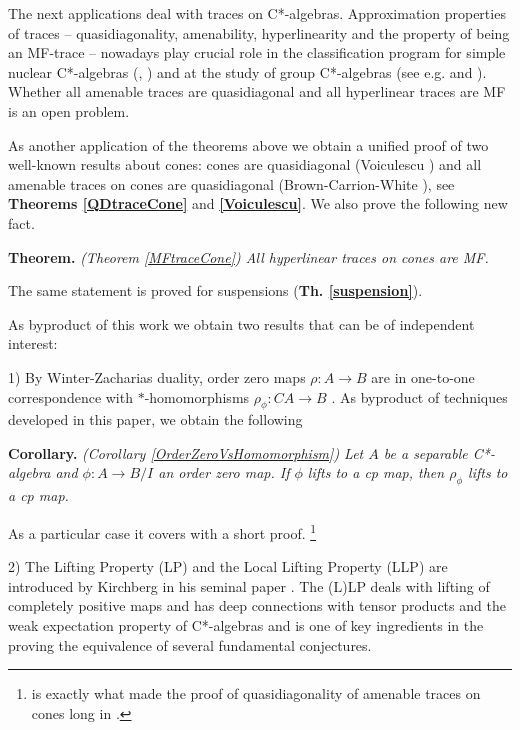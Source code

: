 \documentclass{article}%
\begin{document}
The next applications deal with traces on C*-algebras. Approximation properties of traces -- quasidiagonality, amenability, hyperlinearity and the property of being an MF-trace -- nowadays play crucial role in the classification program for simple nuclear C*-algebras (\cite{TWW},  \cite{Gabe}) and at the study of group C*-algebras (see e.g. \cite{RainoneSch} and \cite{SchafhauserAmalgamated}).
Whether all amenable traces are quasidiagonal and all hyperlinear traces are MF is an open problem.

As another application of the theorems above  we obtain a unified proof of two well-known results about cones: cones are quasidiagonal (Voiculescu \cite{Voiculescu}) and all amenable traces on cones are quasidiagonal (Brown-Carrion-White \cite{BCW}), see {\bf Theorems \ref{QDtraceCone} } and {\bf \ref{Voiculescu}}. We also prove the following new fact.

\medskip

{\bf Theorem.} {\it (Theorem \ref{MFtraceCone}) All hyperlinear traces on cones are MF. }


\medskip

\noindent The same statement is proved for suspensions ({\bf Th. \ref{suspension}}).

\medskip

As byproduct of this work we obtain two results that can be of independent interest:

1) By Winter-Zacharias duality, order zero maps $\rho: A \to B$ are in one-to-one correspondence with $\ast$-homomorphisms  $\rho_{\phi}: CA \to B$ \cite{WZ}. As byproduct of techniques developed in this paper, we obtain the following

\medskip

{\bf Corollary.} {\it  (Corollary \ref{OrderZeroVsHomomorphism}) Let $A$  be a separable C*-algebra and $\phi:A \to B/I$  an order zero map. If $\phi $ lifts to a cp map, then $\rho_{\phi}$ lifts to a cp map.}

\medskip

\noindent As a particular case it covers \cite[Lemma 4.1]{BCW} with a short proof.  \footnote{\cite[Lemma 4.1]{BCW} is exactly what made the proof of quasidiagonality of amenable traces on cones long in \cite{BCW}.}

\medskip

2) The Lifting Property (LP) and the Local Lifting Property (LLP) are introduced by Kirchberg  in his seminal paper \cite{Kirchberg}.
 The (L)LP deals with lifting of completely positive maps and  has deep connections with tensor products and the weak expectation property of C*-algebras  and is one of key ingredients in the proving the equivalence of several fundamental conjectures.
\end{document}
